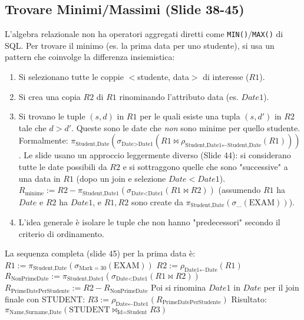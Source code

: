 \subsection{Trovare Minimi/Massimi (Slide 38-45)}
L'algebra relazionale non ha operatori aggregati diretti come \texttt{MIN()}/\texttt{MAX()} di SQL. Per trovare il minimo (es. la prima data per uno studente), si usa un pattern che coinvolge la differenza insiemistica:
\begin{enumerate}
    \item Si selezionano tutte le coppie $<$studente, data$>$ di interesse ($R1$).
    \item Si crea una copia $R2$ di $R1$ rinominando l'attributo data (es. $Date1$).
    \item Si trovano le tuple $(s, d)$ in $R1$ per le quali esiste una tupla $(s, d')$ in $R2$ tale che $d > d'$. Queste sono le date che \textit{non} sono minime per quello studente.
          Formalmente: $\pi_{\text{Student,Date}}(\sigma_{\text{Date}>\text{Date1}}(R1 \Join \rho_{\text{Student,Date1} \leftarrow \text{Student,Date}}(R1)))$.
          Le slide usano un approccio leggermente diverso (Slide 44): si considerano tutte le date possibili da $R2$ e si sottraggono quelle che sono "successive" a una data in $R1$ (dopo un join e selezione $Date < Date1$).
          $R_{\text{minime}} := R2 - \pi_{\text{Student,Date1}}(\sigma_{\text{Date}<\text{Date1}}(R1 \Join R2))$ (assumendo $R1$ ha $Date$ e $R2$ ha $Date1$, e $R1, R2$ sono create da $\pi_{\text{Student,Date}}(\sigma_{\dots}(\text{EXAM}))$).
    \item L'idea generale è isolare le tuple che non hanno "predecessori" secondo il criterio di ordinamento.
\end{enumerate}
La sequenza completa (slide 45) per la prima data è:
$R1 := \pi_{\text{Student,Date}}(\sigma_{\text{Mark}=30}(\text{EXAM}))$
$R2 := \rho_{\text{Date1} \leftarrow \text{Date}}(R1)$
$R_{\text{NonPrimeDate}} := \pi_{\text{Student,Date1}}(\sigma_{\text{Date} < \text{Date1}}(R1 \Join R2))$
$R_{\text{PrimeDatePerStudente}} := R2 - R_{\text{NonPrimeDate}}$
Poi si rinomina $Date1$ in $Date$ per il join finale con STUDENT:
$R3 := \rho_{\text{Date} \leftarrow \text{Date1}}(R_{\text{PrimeDatePerStudente}})$
Risultato: $\pi_{\text{Name,Surname,Date}}(\text{STUDENT} \Join_{\text{Id}=\text{Student}} R3)$

